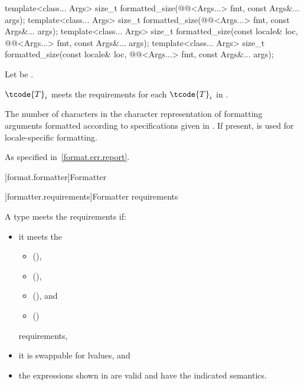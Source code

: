 %
\begin{itemdecl}
template<class... Args>
  size_t formatted_size(@@<Args...> fmt, const Args&... args);
template<class... Args>
  size_t formatted_size(@@<Args...> fmt, const Args&... args);
template<class... Args>
  size_t formatted_size(const locale& loc, @@<Args...> fmt, const Args&... args);
template<class... Args>
  size_t formatted_size(const locale& loc, @@<Args...> fmt, const Args&... args);
\end{itemdecl}

\begin{itemdescr}
\pnum
Let  be .

\pnum
\expects
{}$\tcode{T}_i$
meets the  requirements
for each $\tcode{T}_i$ in .

\pnum
\returns
The number of characters in the character representation of
formatting arguments 
formatted according to specifications given in .
If present,  is used for locale-specific formatting.

\pnum
\throws
As specified in~\ref{format.err.report}.
\end{itemdescr}

[format.formatter]{Formatter}

[formatter.requirements]{Formatter requirements}

\pnum
A type  meets the  requirements if:
\begin{itemize}
\item
it meets the
\begin{itemize}
\item {} (),
\item {} (),
\item {} (), and
\item {} ()
\end{itemize}
requirements,

\item
it is swappable for lvalues, and

\item
the expressions shown in  are valid and
have the indicated semantics.
\end{itemize}

